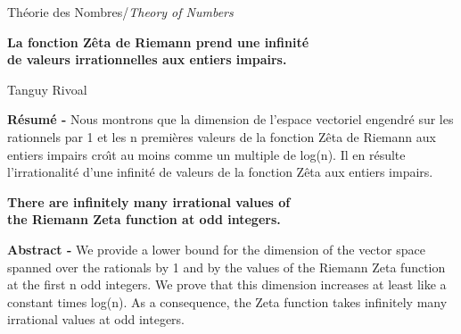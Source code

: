 \documentclass[11pt]{article}
\begin{document}
\noindent Th\'eorie des Nombres/{\sl Theory of Numbers}
\par
\begin{center}{\bf La fonction Z\^eta de Riemann prend une infinit\'e \\
de valeurs irrationnelles aux entiers impairs.}
\end{center}
\begin{center}{\sc Tanguy Rivoal}
\end{center}
\footnotesize
{\resu}
{{\bf R\'esum\'e -}
Nous montrons que la dimension de l'espace
vectoriel engendr\'e sur les rationnels par 1 et les n premi\`eres valeurs
de la fonction Z\^eta de Riemann aux entiers impairs cro\^{\i}t au moins
comme un multiple de log(n). Il en r\'esulte l'irrationalit\'e d'une
infinit\'e de valeurs de la fonction Z\^eta aux  entiers impairs.}
\begin{center}{\bf There are infinitely many irrational values of \\
the Riemann Zeta function at odd integers.}
\end{center}
{\resu} {{\bf Abstract -}
We provide a lower bound for the dimension of the vector
space spanned over the rationals by 1 and by the values of the Riemann Zeta
function at the first n odd integers. We prove that this dimension
increases at least like a constant times  log(n). As a consequence, the
Zeta function takes infinitely many irrational values at odd  integers.\\}
\end{document}
